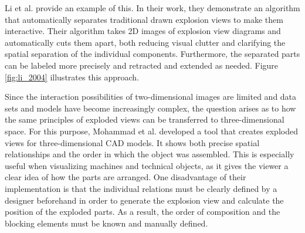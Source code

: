 Li et al. provide an example of this.\cite{li2004interactive} In their work, they demonstrate an algorithm that automatically separates traditional drawn explosion views to make them interactive.
Their algorithm takes 2D images of explosion view diagrams and automatically cuts them apart, both reducing visual clutter and clarifying the spatial separation of the individual components. 
Furthermore, the separated parts can be labeled more precisely and retracted and extended as needed. Figure \ref{fig:li_2004} illustrates this approach.

Since the interaction possibilities of two-dimensional images are limited and data sets and models have become increasingly complex, the question arises as to how the same principles of exploded views can be transferred to three-dimensional space.
For this purpose, Mohammad et al.\cite{Mohammad_1993} developed a tool that creates exploded views for three-dimensional CAD models. It shows both precise spatial relationships and the order in which the object was assembled.
This is especially useful when visualizing machines and technical objects, as it gives the viewer a clear idea of how the parts are arranged.
One disadvantage of their implementation is that the individual relations must be clearly defined by a designer beforehand in order to generate the explosion view and calculate the position of the exploded parts.
As a result, the order of composition and the blocking elements must be known and manually defined.

